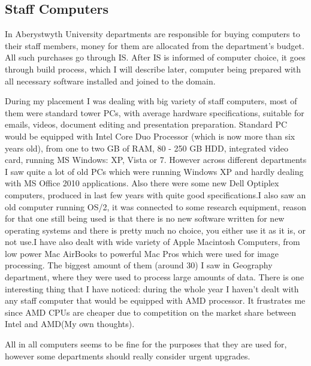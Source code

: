 \documentclass[10pt,a4paper,headinclude=true]{report}
\begin{document}
\subsection{Staff Computers}
In Aberystwyth University departments are responsible for buying computers to their staff members, money for them are allocated from the department's budget. All such purchases go through IS. After IS is informed of computer choice, it goes through build process, which I will describe later, computer being prepared with all necessary software installed and joined to the domain. 

During my placement I was dealing with big variety of staff computers, most of them were standard tower PCs, with average hardware specifications, suitable for emails, videos, document editing and presentation preparation. Standard PC would be equipped with Intel Core Duo Processor (which is now more than six years old), from one to two GB of RAM, 80 - 250 GB HDD, integrated video card, running MS Windows: XP, Vista or 7. However across different departments I saw quite a lot of old PCs which were running Windows XP and hardly dealing with MS Office 2010 applications. Also there were some new Dell Optiplex computers, produced in last few years with quite good specifications.I also saw an old computer running OS/2, it was connected to some research equipment, reason for that one still being used is that there is no new software written for new operating systems and there is pretty much no choice, you either use it as it is, or not use.I have also dealt with wide variety of Apple Macintosh Computers, from low power Mac AirBooks to powerful Mac Pros which were used for image processing. The biggest amount of them (around 30) I saw in Geography department, where they were used to process large amounts of data. There is one interesting thing that I have noticed: during the whole year I haven't dealt with any staff computer that would be equipped with AMD processor. It frustrates me since AMD CPUs are cheaper due to competition on the market share between Intel and AMD(My own thoughts).

All in all computers seems to be fine for the purposes that they are used for, however some departments should really consider urgent upgrades. 
\end{document}
